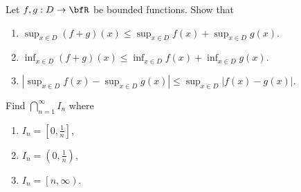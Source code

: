 \documentclass[10pt,twoside,openany]{memoir}
\begin{document}
    \begin{exercise}
        Let $f,g:D \rightarrow \bfR$ be bounded functions. Show that
            \begin{enumerate}[label = (\arabic*)]
                \item $\sup_{x\in D}(f+g)(x) \leq \sup_{x\in D}f(x) + \sup_{x\in D}g(x)$.
                \item $\inf_{x\in D}(f+g)(x) \leq \inf_{x\in D}f(x) + \inf_{x\in D}g(x)$.
                \item $\left|\sup_{x \in D}f(x) - \sup_{x \in D}g(x)\right| \leq \sup_{x\in D}\left|f(x) - g(x)\right|$.
            \end{enumerate}
    \end{exercise}
    \begin{exercise}
        Find $\bigcap_{n = 1}^\infty I_n$ where
            \begin{enumerate}[label = (\arabic*)]
                \item $I_n = \left[0,\frac{1}{n}\right]$,
                \item $I_n = \left(0, \frac{1}{n}\right)$,
                \item $I_n = \left[n , \infty\right)$.
            \end{enumerate}
    \end{exercise}
\end{document}

